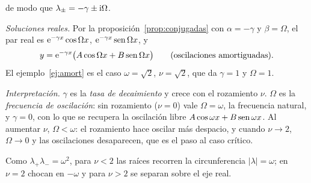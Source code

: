 \documentclass[11pt,twoside]{article}
\newcommand\abs[1]{\lvert#1\rvert}
\begin{document}
\begin{ejemplo}[$y''+\nu\omega\,y'+\omega^2y=0$, con $\nu\ge0$, $\omega>0$]
\begin{pasos}
\begin{equation*}
\end{equation*}
de modo que $\lambda_\pm=-\gamma\pm\mathrm{i}\Omega$.
\item \emph{Soluciones reales.} Por la proposición~\ref{prop:conjugadas} con $\alpha=-\gamma$ y $\beta=\Omega$, el par real es
$\mathrm{e}^{-\gamma x}\cos\Omega x$, $\mathrm{e}^{-\gamma x}\operatorname{sen}\Omega x$, y
\begin{equation}\label{eq:subamort}
y=\mathrm{e}^{-\gamma x}\big(A\cos\Omega x+B\operatorname{sen}\Omega x\big)\qquad\text{(oscilaciones amortiguadas)}.
\end{equation}
El ejemplo~\ref{ej:amort} es el caso $\omega=\sqrt2$, $\nu=\sqrt2$, que da $\gamma=1$ y $\Omega=1$.
\end{pasos}
\emph{Interpretación.} $\gamma$ es la \emph{tasa de decaimiento} y crece con el rozamiento $\nu$. $\Omega$ es la
\emph{frecuencia de oscilación}: sin rozamiento ($\nu=0$) vale $\Omega=\omega$, la frecuencia natural, y $\gamma=0$, con lo
que se recupera la oscilación libre $A\cos\omega x+B\operatorname{sen}\omega x$. Al aumentar $\nu$, $\Omega<\omega$: el rozamiento hace
oscilar más despacio, y cuando $\nu\to2$, $\Omega\to0$ y las oscilaciones desaparecen, que es el paso al caso crítico.

Como $\lambda_+\lambda_-=\omega^2$, para $\nu<2$ las raíces recorren la circunferencia $\abs\lambda=\omega$; en $\nu=2$ chocan
en $-\omega$ y para $\nu>2$ se separan sobre el eje real.
\end{ejemplo}
\end{document}
